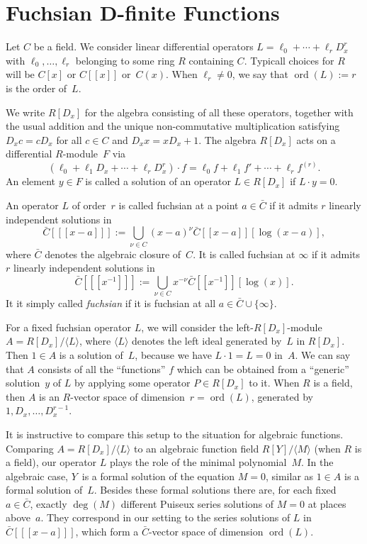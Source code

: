 \documentclass{sig-alternate}
\def\ord{\operatorname{ord}}
\def\<#1>{\langle#1\rangle}
\begin{document}
\section{Fuchsian D-finite Functions}

Let $C$ be a field. We consider linear differential operators
$L=\ell_0+\cdots+\ell_rD_x^r$ with $\ell_0,\dots,\ell_r$ belonging to some ring
$R$ containing $C$. 
Typicall choices for $R$ will be $C[x]$ or $C[[x]]$ or~$C(x)$.
When $\ell_r\neq0$, we say that $\ord(L):=r$ is the order of~$L$.

We write $R[D_x]$ for the algebra consisting of all these operators, together
with the usual addition and the unique non-commutative multiplication satisfying
$D_xc=cD_x$ for all $c\in C$ and $D_xx=xD_x+1$.
The algebra $R[D_x]$ acts on a differential $R$-module~$F$ via
\[
  (\ell_0+\ell_1D_x+\cdots+\ell_rD_x^r)\cdot f=
   \ell_0f + \ell_1f' + \cdots + \ell_r f^{(r)}.
\]
An element $y\in F$ is called a solution of an operator $L\in R[D_x]$ if
$L\cdot y=0$.

An operator $L$ of order~$r$ is called fuchsian at a point $a\in\bar C$ if
it admits $r$ linearly independent solutions in
\[
  \bar C[[[x-a]]] := \bigcup_{\nu\in C} (x-a)^\nu\bar C[[x-a]][\log(x-a)],
\]
where $\bar C$ denotes the algebraic closure of~$C$. It is called fuchsian
at $\infty$ if it admits $r$ linearly independent solutions in
\[
  \bar C[[[x^{-1}]]] := \bigcup_{\nu\in C} x^{-\nu} \bar C[[x^{-1}]][\log(x)].
\]
It it simply called \emph{fuchsian} if it is fuchsian at all $a\in\bar C\cup\{\infty\}$.

For a fixed fuchsian operator $L$, we will consider the left-$R[D_x]$-module
$A=R[D_x]/\<L>$, where $\<L>$ denotes the left ideal generated by~$L$ in
$R[D_x]$.  Then $1\in A$ is a solution of~$L$, because we have $L\cdot 1=L=0$
in~$A$. We can say that $A$ consists of all the ``functions'' $f$ which can be
obtained from a ``generic'' solution~$y$ of $L$ by applying some operator $P\in
R[D_x]$ to it. When $R$ is a field, then $A$ is an $R$-vector space of
dimension~$r=\ord(L)$, generated by $1,D_x,\dots,D_x^{r-1}$. 

It is instructive to compare this setup to the situation for algebraic
functions. Comparing $A=R[D_x]/\<L>$ to an algebraic function field $R[Y]/\<M>$
(when $R$ is a field), our operator $L$ plays the role of the minimal
polynomial~$M$. In the algebraic case, $Y$~is a formal solution of the equation
$M=0$, similar as $1\in A$ is a formal solution of~$L$. Besides these formal
solutions there are, for each fixed $a\in\bar C$, exactly $\deg(M)$ different
Puiseux series solutions of $M=0$ at places above~$a$. They correspond in our
setting to the series solutions of $L$ in $\bar C[[[x-a]]]$, which form a $\bar
C$-vector space of dimension $\ord(L)$.
\end{document}

